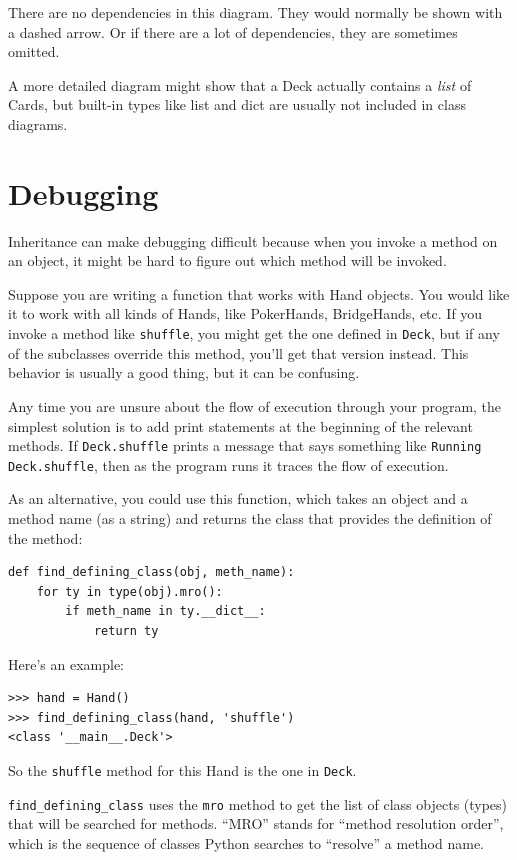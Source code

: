 \documentclass[10pt]{book}
\begin{document}
There are no dependencies in this diagram.  They would normally
be shown with a dashed arrow.  Or if there are a lot of
dependencies, they are sometimes omitted.

A more detailed diagram might show that a Deck actually
contains a {\em list} of Cards, but built-in types
like list and dict are usually not included in class diagrams.


\section{Debugging}

Inheritance can make debugging difficult because when you invoke a
method on an object, it might be hard to figure out which method will
be invoked.

Suppose you are writing a function that works with Hand objects.
You would like it to work with all kinds of Hands, like
PokerHands, BridgeHands, etc.  If you invoke a method like
{\tt shuffle}, you might get the one defined in {\tt Deck},
but if any of the subclasses override this method, you'll
get that version instead.  This behavior is usually a good
thing, but it can be confusing.

Any time you are unsure about the flow of execution through your
program, the simplest solution is to add print statements at the
beginning of the relevant methods.  If {\tt Deck.shuffle} prints a
message that says something like {\tt Running Deck.shuffle}, then as
the program runs it traces the flow of execution.

As an alternative, you could use this function, which takes an
object and a method name (as a string) and returns the class that
provides the definition of the method:

\begin{verbatim}
def find_defining_class(obj, meth_name):
    for ty in type(obj).mro():
        if meth_name in ty.__dict__:
            return ty
\end{verbatim}
%
Here's an example:

\begin{verbatim}
>>> hand = Hand()
>>> find_defining_class(hand, 'shuffle')
<class '__main__.Deck'>
\end{verbatim}
%
So the {\tt shuffle} method for this Hand is the one in {\tt Deck}.

\verb"find_defining_class" uses the {\tt mro} method to get the list
of class objects (types) that will be searched for methods.  ``MRO''
stands for ``method resolution order'', which is the sequence of
classes Python searches to ``resolve'' a method name.
\end{document}
